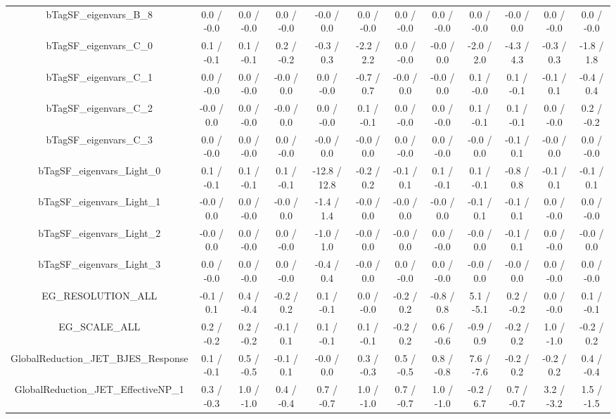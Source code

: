 \begin{table}[htbp]
\begin{center}
\begin{tabular}{|c|c|c|c|c|c|c|c|c|c|c|c|}
  bTagSF_eigenvars_B_8 & 0.0 / -0.0 & 0.0 / -0.0 & 0.0 / -0.0 & -0.0 / 0.0 & 0.0 / -0.0 & 0.0 / -0.0 & 0.0 / -0.0 & 0.0 / -0.0 & -0.0 / 0.0 & 0.0 / -0.0 & 0.0 / -0.0 \\ 
  bTagSF_eigenvars_C_0 & 0.1 / -0.1 & 0.1 / -0.1 & 0.2 / -0.2 & -0.3 / 0.3 & -2.2 / 2.2 & 0.0 / -0.0 & -0.0 / 0.0 & -2.0 / 2.0 & -4.3 / 4.3 & -0.3 / 0.3 & -1.8 / 1.8 \\ 
  bTagSF_eigenvars_C_1 & 0.0 / -0.0 & 0.0 / -0.0 & -0.0 / 0.0 & 0.0 / -0.0 & -0.7 / 0.7 & -0.0 / 0.0 & -0.0 / 0.0 & 0.1 / -0.0 & 0.1 / -0.1 & -0.1 / 0.1 & -0.4 / 0.4 \\ 
  bTagSF_eigenvars_C_2 & -0.0 / 0.0 & 0.0 / -0.0 & -0.0 / 0.0 & 0.0 / -0.0 & 0.1 / -0.1 & 0.0 / -0.0 & 0.0 / -0.0 & 0.1 / -0.1 & 0.1 / -0.1 & 0.0 / -0.0 & 0.2 / -0.2 \\ 
  bTagSF_eigenvars_C_3 & 0.0 / -0.0 & 0.0 / -0.0 & 0.0 / -0.0 & -0.0 / 0.0 & -0.0 / 0.0 & 0.0 / -0.0 & 0.0 / -0.0 & -0.0 / 0.0 & -0.1 / 0.1 & -0.0 / 0.0 & 0.0 / -0.0 \\ 
  bTagSF_eigenvars_Light_0 & 0.1 / -0.1 & 0.1 / -0.1 & 0.1 / -0.1 & -12.8 / 12.8 & -0.2 / 0.2 & -0.1 / 0.1 & 0.1 / -0.1 & 0.1 / -0.1 & -0.8 / 0.8 & -0.1 / 0.1 & -0.1 / 0.1 \\ 
  bTagSF_eigenvars_Light_1 & -0.0 / 0.0 & 0.0 / -0.0 & -0.0 / 0.0 & -1.4 / 1.4 & -0.0 / 0.0 & -0.0 / 0.0 & -0.0 / 0.0 & -0.1 / 0.1 & -0.1 / 0.1 & 0.0 / -0.0 & 0.0 / -0.0 \\ 
  bTagSF_eigenvars_Light_2 & -0.0 / 0.0 & 0.0 / -0.0 & 0.0 / -0.0 & -1.0 / 1.0 & -0.0 / 0.0 & -0.0 / 0.0 & 0.0 / -0.0 & -0.0 / 0.0 & -0.1 / 0.1 & 0.0 / -0.0 & -0.0 / 0.0 \\ 
  bTagSF_eigenvars_Light_3 & 0.0 / -0.0 & 0.0 / -0.0 & 0.0 / -0.0 & -0.4 / 0.4 & -0.0 / 0.0 & 0.0 / -0.0 & 0.0 / -0.0 & -0.0 / 0.0 & -0.0 / 0.0 & 0.0 / -0.0 & 0.0 / -0.0 \\ 
  EG_RESOLUTION_ALL & -0.1 / 0.1 & 0.4 / -0.4 & -0.2 / 0.2 & 0.1 / -0.1 & 0.0 / -0.0 & -0.2 / 0.2 & -0.8 / 0.8 & 5.1 / -5.1 & 0.2 / -0.2 & 0.0 / -0.0 & 0.1 / -0.1 \\ 
  EG_SCALE_ALL & 0.2 / -0.2 & 0.2 / -0.2 & -0.1 / 0.1 & 0.1 / -0.1 & 0.1 / -0.1 & -0.2 / 0.2 & 0.6 / -0.6 & -0.9 / 0.9 & -0.2 / 0.2 & 1.0 / -1.0 & -0.2 / 0.2 \\ 
  GlobalReduction_JET_BJES_Response & 0.1 / -0.1 & 0.5 / -0.5 & -0.1 / 0.1 & -0.0 / 0.0 & 0.3 / -0.3 & 0.5 / -0.5 & 0.8 / -0.8 & 7.6 / -7.6 & -0.2 / 0.2 & -0.2 / 0.2 & 0.4 / -0.4 \\ 
  GlobalReduction_JET_EffectiveNP_1 & 0.3 / -0.3 & 1.0 / -1.0 & 0.4 / -0.4 & 0.7 / -0.7 & 1.0 / -1.0 & 0.7 / -0.7 & 1.0 / -1.0 & -0.2 / 6.7 & 0.7 / -0.7 & 3.2 / -3.2 & 1.5 / -1.5 \\ 

\end{tabular}
\end{center}
\end{table}

